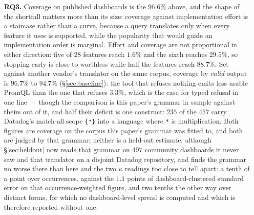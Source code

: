 \textbf{RQ3.} Coverage on published dashboards is the $96.6\%$ above, and the shape of
the shortfall matters more than its size: coverage against implementation effort is a
staircase rather than a curve, because a query translates only when every feature it uses
is supported, while the popularity that would guide an implementation order is marginal.
Effort and coverage are not proportional in either direction: five of $28$ features
reach $1.6\%$ and the sixth reaches $29.5\%$, so stopping early is close to worthless
while half the features reach $88.7\%$. Set against another
vendor's translator on the same corpus, coverage by \emph{valid} output is $96.7\%$ to
$94.7\%$ (\S\ref{sec:baseline}): the tool that refuses nothing emits less usable PromQL
than the one that refuses $3.3\%$, which is the case for typed refusal in one line ---
though the comparison is this paper's grammar in sample against theirs out of it, and
half their deficit is one construct: $235$ of the $457$ carry Datadog's match-all scope
\texttt{\{*\}} into a language where \texttt{*} is multiplication. Both figures are
coverage on the corpus this paper's grammar was fitted to, and both are judged by that
grammar; neither is a held-out estimate, although \S\ref{sec:heldout} now reads that grammar on
$497$ community dashboards it never saw and that translator on a disjoint Datadog
repository, and finds the grammar no worse there than here and the two $\kappa$ readings
too close to tell apart: a tenth of a point over occurrences, against the $1.1$ points
of dashboard-clustered standard error on that occurrence-weighted figure, and two tenths
the other way over distinct forms, for which no dashboard-level spread is computed and
which is therefore reported without one.

